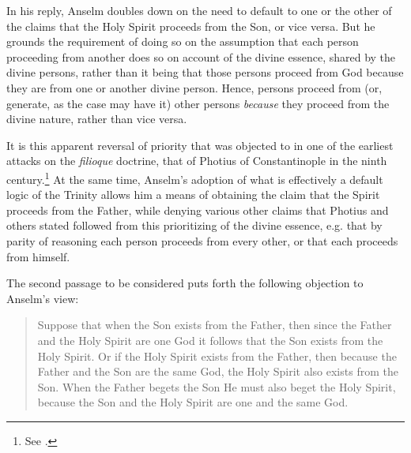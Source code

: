 \documentclass[]{article}
\begin{document}
In his reply, Anselm doubles down on the need to default to one or the other of the claims that the Holy Spirit proceeds from the Son, or vice versa. But he grounds the requirement of doing so on the assumption that each person proceeding from another does so on account of the divine essence, shared by the divine persons, rather than it being that those persons proceed from God because they are from one or another divine person. Hence, persons proceed from (or, generate, as the case may have it) other persons \textit{because} they proceed from the divine nature, rather than vice versa.

It is this apparent reversal of priority that was objected to in one of the earliest attacks on the \textit{filioque} doctrine, that of Photius of Constantinople in the ninth century.\footnote{See \autocite[Part 1, par. 6]{PhotiusMyst}.} At the same time, Anselm's adoption of what is effectively a default logic of the Trinity allows him a means of obtaining the claim that the Spirit proceeds from the Father, while denying various other claims that Photius and others stated followed from this prioritizing of the divine essence, e.g. that by parity of reasoning each person proceeds from every other, or that each proceeds from himself.

The second passage to be considered puts forth the following objection to Anselm's view:

\begin{quote}
Suppose that when the Son exists from the Father, then since the Father and the Holy Spirit are one God it follows that the Son exists from the Holy Spirit. Or if the Holy Spirit exists from the Father, then because the Father and the Son are the same God, the Holy Spirit also exists from the Son. When the Father begets the Son He must also beget the Holy Spirit, because the Son and the Holy Spirit are one and the same God.\autocite[474]{AnselmDeProc}
\end{quote}
\end{document}
